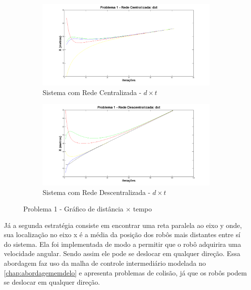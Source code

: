 \begin{figure}[!htb]
	\centering
	\begin{subfigure}{.5\textwidth}
		\centering
		\includegraphics[width=.9\linewidth]{./04-figuras/Simulacoes/Sim_RedeCentralizada_dxt}
		\caption{Sistema com Rede Centralizada - $d\times t$}
		\label{fig:P1_C_DxT}
	\end{subfigure}%
	\begin{subfigure}{.5\textwidth}
		\centering
		\includegraphics[width=.9\linewidth]{./04-figuras/Simulacoes/Sim_RedeDescentralizada_dxt}
		\caption{Sistema com Rede Descentralizada - $d\times t$}
		\label{fig:P1_D_DxT}
	\end{subfigure}
	\caption{Problema 1 - Gráfico de distância $\times$ tempo}
	\label{fig:sP1DxT}
\end{figure}

Já a segunda estratégia consiste em encontrar uma reta paralela ao eixo y onde, sua localização no eixo x é a média da posição dos robôs mais distantes entre sí do sistema. Ela foi implementada de modo a permitir que o robô adquirira uma velocidade angular. Sendo assim ele pode se deslocar em qualquer direção. Essa abordagem faz uso da malha de controle intermediário modelada no \autoref{chap:abordagememdelo} e apresenta problemas de colisão, já que os robôs podem se deslocar em qualquer direção.

